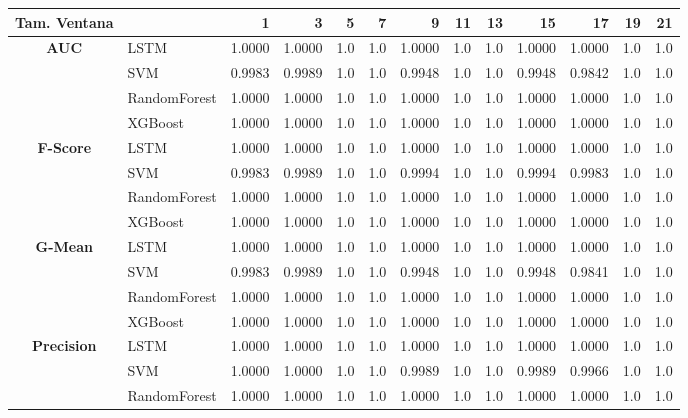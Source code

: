 \begin{table}[h]
	\centering
	\begin{adjustbox}{max width=13cm}
		\begin{tabular}{|c|l|r|r|r|r|r|r|r|r|r|r|r|}
			\hline
			\textbf{Tam. Ventana}&         &      1  &      3  &   5  &   7  &      9  &   11 &   13 &      15 &      17 &   19 &   21 \\
			\hline
			\textbf{AUC} & LSTM &  1.0000 &  1.0000 &  1.0 &  1.0 &  1.0000 &  1.0 &  1.0 &  1.0000 &  1.0000 &  1.0 &  1.0 \\
			& SVM &  0.9983 &  0.9989 &  1.0 &  1.0 &  0.9948 &  1.0 &  1.0 &  0.9948 &  0.9842 &  1.0 &  1.0 \\
			& RandomForest &  1.0000 &  1.0000 &  1.0 &  1.0 &  1.0000 &  1.0 &  1.0 &  1.0000 &  1.0000 &  1.0 &  1.0 \\
			& XGBoost &  1.0000 &  1.0000 &  1.0 &  1.0 &  1.0000 &  1.0 &  1.0 &  1.0000 &  1.0000 &  1.0 &  1.0 \\
			\hline
			\textbf{F-Score} & LSTM &  1.0000 &  1.0000 &  1.0 &  1.0 &  1.0000 &  1.0 &  1.0 &  1.0000 &  1.0000 &  1.0 &  1.0 \\
			& SVM &  0.9983 &  0.9989 &  1.0 &  1.0 &  0.9994 &  1.0 &  1.0 &  0.9994 &  0.9983 &  1.0 &  1.0 \\
			& RandomForest &  1.0000 &  1.0000 &  1.0 &  1.0 &  1.0000 &  1.0 &  1.0 &  1.0000 &  1.0000 &  1.0 &  1.0 \\
			& XGBoost &  1.0000 &  1.0000 &  1.0 &  1.0 &  1.0000 &  1.0 &  1.0 &  1.0000 &  1.0000 &  1.0 &  1.0 \\
			\hline
			\textbf{G-Mean} & LSTM &  1.0000 &  1.0000 &  1.0 &  1.0 &  1.0000 &  1.0 &  1.0 &  1.0000 &  1.0000 &  1.0 &  1.0 \\
			& SVM &  0.9983 &  0.9989 &  1.0 &  1.0 &  0.9948 &  1.0 &  1.0 &  0.9948 &  0.9841 &  1.0 &  1.0 \\
			& RandomForest &  1.0000 &  1.0000 &  1.0 &  1.0 &  1.0000 &  1.0 &  1.0 &  1.0000 &  1.0000 &  1.0 &  1.0 \\
			& XGBoost &  1.0000 &  1.0000 &  1.0 &  1.0 &  1.0000 &  1.0 &  1.0 &  1.0000 &  1.0000 &  1.0 &  1.0 \\
			\hline
			\textbf{Precision} & LSTM &  1.0000 &  1.0000 &  1.0 &  1.0 &  1.0000 &  1.0 &  1.0 &  1.0000 &  1.0000 &  1.0 &  1.0 \\
			& SVM &  1.0000 &  1.0000 &  1.0 &  1.0 &  0.9989 &  1.0 &  1.0 &  0.9989 &  0.9966 &  1.0 &  1.0 \\
			& RandomForest &  1.0000 &  1.0000 &  1.0 &  1.0 &  1.0000 &  1.0 &  1.0 &  1.0000 &  1.0000 &  1.0 &  1.0 \\

\end{tabular}
\end{adjustbox}
\end{table}
